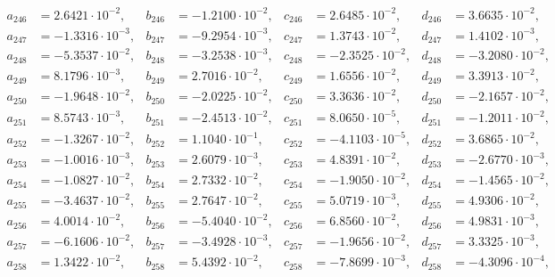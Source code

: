 \begin{align*}
  a_{ 246 } &= 2.6421 \cdot 10^{ -2 }, & b_{ 246 } &= -1.2100 \cdot 10^{ -2 }, & c_{ 246 } &= 2.6485 \cdot 10^{ -2 }, & d_{ 246 } &= 3.6635 \cdot 10^{ -2 }, \\ 
  a_{ 247 } &= -1.3316 \cdot 10^{ -3 }, & b_{ 247 } &= -9.2954 \cdot 10^{ -3 }, & c_{ 247 } &= 1.3743 \cdot 10^{ -2 }, & d_{ 247 } &= 1.4102 \cdot 10^{ -3 }, \\ 
  a_{ 248 } &= -5.3537 \cdot 10^{ -2 }, & b_{ 248 } &= -3.2538 \cdot 10^{ -3 }, & c_{ 248 } &= -2.3525 \cdot 10^{ -2 }, & d_{ 248 } &= -3.2080 \cdot 10^{ -2 }, \\ 
  a_{ 249 } &= 8.1796 \cdot 10^{ -3 }, & b_{ 249 } &= 2.7016 \cdot 10^{ -2 }, & c_{ 249 } &= 1.6556 \cdot 10^{ -2 }, & d_{ 249 } &= 3.3913 \cdot 10^{ -2 }, \\ 
  a_{ 250 } &= -1.9648 \cdot 10^{ -2 }, & b_{ 250 } &= -2.0225 \cdot 10^{ -2 }, & c_{ 250 } &= 3.3636 \cdot 10^{ -2 }, & d_{ 250 } &= -2.1657 \cdot 10^{ -2 }, \\ 
  a_{ 251 } &= 8.5743 \cdot 10^{ -3 }, & b_{ 251 } &= -2.4513 \cdot 10^{ -2 }, & c_{ 251 } &= 8.0650 \cdot 10^{ -5 }, & d_{ 251 } &= -1.2011 \cdot 10^{ -2 }, \\ 
  a_{ 252 } &= -1.3267 \cdot 10^{ -2 }, & b_{ 252 } &= 1.1040 \cdot 10^{ -1 }, & c_{ 252 } &= -4.1103 \cdot 10^{ -5 }, & d_{ 252 } &= 3.6865 \cdot 10^{ -2 }, \\ 
  a_{ 253 } &= -1.0016 \cdot 10^{ -3 }, & b_{ 253 } &= 2.6079 \cdot 10^{ -3 }, & c_{ 253 } &= 4.8391 \cdot 10^{ -2 }, & d_{ 253 } &= -2.6770 \cdot 10^{ -3 }, \\ 
  a_{ 254 } &= -1.0827 \cdot 10^{ -2 }, & b_{ 254 } &= 2.7332 \cdot 10^{ -2 }, & c_{ 254 } &= -1.9050 \cdot 10^{ -2 }, & d_{ 254 } &= -1.4565 \cdot 10^{ -2 }, \\ 
  a_{ 255 } &= -3.4637 \cdot 10^{ -2 }, & b_{ 255 } &= 2.7647 \cdot 10^{ -2 }, & c_{ 255 } &= 5.0719 \cdot 10^{ -3 }, & d_{ 255 } &= 4.9306 \cdot 10^{ -2 }, \\ 
  a_{ 256 } &= 4.0014 \cdot 10^{ -2 }, & b_{ 256 } &= -5.4040 \cdot 10^{ -2 }, & c_{ 256 } &= 6.8560 \cdot 10^{ -2 }, & d_{ 256 } &= 4.9831 \cdot 10^{ -3 }, \\ 
  a_{ 257 } &= -6.1606 \cdot 10^{ -2 }, & b_{ 257 } &= -3.4928 \cdot 10^{ -3 }, & c_{ 257 } &= -1.9656 \cdot 10^{ -2 }, & d_{ 257 } &= 3.3325 \cdot 10^{ -3 }, \\ 
  a_{ 258 } &= 1.3422 \cdot 10^{ -2 }, & b_{ 258 } &= 5.4392 \cdot 10^{ -2 }, & c_{ 258 } &= -7.8699 \cdot 10^{ -3 }, & d_{ 258 } &= -4.3096 \cdot 10^{ -4 }, \\ 

\end{align*}

